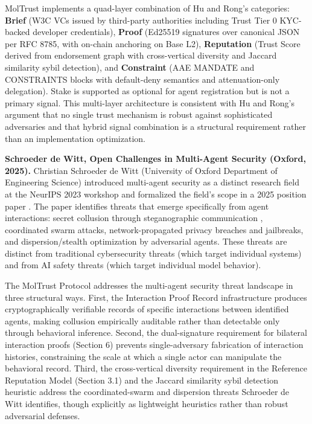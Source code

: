 MolTrust implements a quad-layer combination of Hu and Rong's categories: \textbf{Brief} (W3C VCs issued by third-party authorities including Trust Tier 0 KYC-backed developer credentials), \textbf{Proof} (Ed25519 signatures over canonical JSON per RFC 8785, with on-chain anchoring on Base L2), \textbf{Reputation} (Trust Score derived from endorsement graph with cross-vertical diversity and Jaccard similarity sybil detection), and \textbf{Constraint} (AAE MANDATE and CONSTRAINTS blocks with default-deny semantics and attenuation-only delegation). Stake is supported as optional for agent registration but is not a primary signal. This multi-layer architecture is consistent with Hu and Rong's argument that no single trust mechanism is robust against sophisticated adversaries and that hybrid signal combination is a structural requirement rather than an implementation optimization.


\textbf{Schroeder de Witt, Open Challenges in Multi-Agent Security (Oxford, 2025).} Christian Schroeder de Witt (University of Oxford Department of Engineering Science) introduced multi-agent security as a distinct research field at the NeurIPS 2023 workshop and formalized the field's scope in a 2025 position paper \cite{ref14_schroederdewitt}. The paper identifies threats that emerge specifically from agent interactions: secret collusion through steganographic communication \cite{ref26_motwani}, coordinated swarm attacks, network-propagated privacy breaches and jailbreaks, and dispersion/stealth optimization by adversarial agents. These threats are distinct from traditional cybersecurity threats (which target individual systems) and from AI safety threats (which target individual model behavior).


The MolTrust Protocol addresses the multi-agent security threat landscape in three structural ways. First, the Interaction Proof Record infrastructure produces cryptographically verifiable records of specific interactions between identified agents, making collusion empirically auditable rather than detectable only through behavioral inference. Second, the dual-signature requirement for bilateral interaction proofs (Section 6) prevents single-adversary fabrication of interaction histories, constraining the scale at which a single actor can manipulate the behavioral record. Third, the cross-vertical diversity requirement in the Reference Reputation Model (Section 3.1) and the Jaccard similarity sybil detection heuristic address the coordinated-swarm and dispersion threats Schroeder de Witt identifies, though explicitly as lightweight heuristics rather than robust adversarial defenses.



